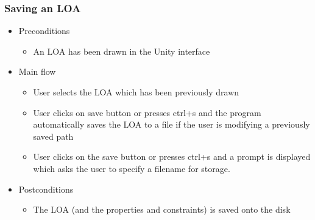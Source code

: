 \subsubsection{Saving an LOA}
    \begin{itemize}
    \item Preconditions
        \begin{itemize}
            \item An LOA has been drawn in the Unity interface
        \end{itemize}
    \end{itemize}
    \begin{itemize}
        \item Main flow
        \begin{itemize}
            \item User selects the LOA which has been previously drawn
            \item User clicks on save button or presses ctrl+s and the program automatically saves the LOA to a file if the user is modifying a previously saved path
            \item User clicks on the save button or presses ctrl+s and a prompt is displayed which asks the user to specify a filename for storage.
        \end{itemize}
    \end{itemize}
    \begin{itemize}
        \item Postconditions
        \begin{itemize}
            \item The LOA (and the properties and constraints) is saved onto the disk
        \end{itemize}
    \end{itemize}

